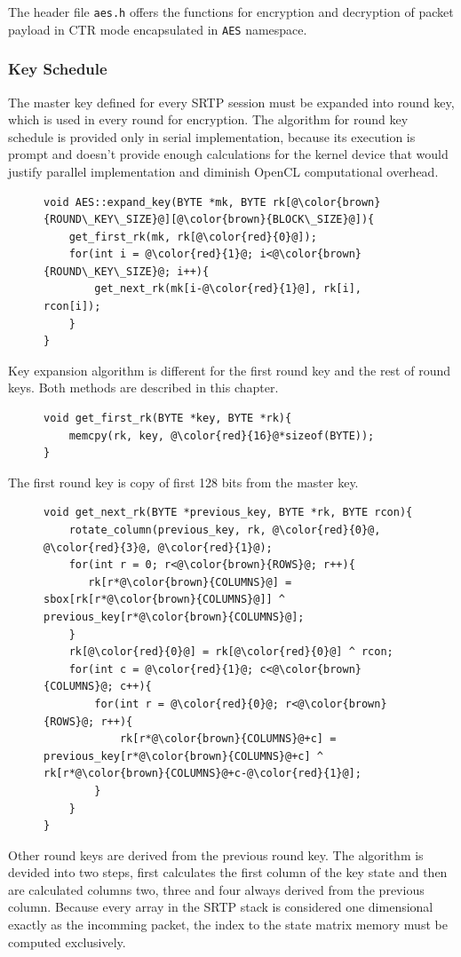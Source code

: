 The header file \texttt{aes.h} offers the functions for encryption and 
decryption of packet payload in CTR mode encapsulated in \texttt{AES} namespace.

\subsubsection*{Key Schedule}
The master key defined for every SRTP session must be expanded into round key,
which is used in every round for encryption. The algorithm for round key schedule
is provided only in serial implementation, because its execution is prompt and
doesn't provide enough calculations for the kernel device that would justify
parallel implementation and diminish OpenCL computational overhead.

\begin{figure}[H]
\begin{lstlisting}
void AES::expand_key(BYTE *mk, BYTE rk[@\color{brown}{ROUND\_KEY\_SIZE}@][@\color{brown}{BLOCK\_SIZE}@]){
    get_first_rk(mk, rk[@\color{red}{0}@]);
    for(int i = @\color{red}{1}@; i<@\color{brown}{ROUND\_KEY\_SIZE}@; i++){
        get_next_rk(mk[i-@\color{red}{1}@], rk[i], rcon[i]);
    }
}
\end{lstlisting}
\end{figure}

Key expansion algorithm is different for the first round key and the rest of
round keys. Both methods are described in this chapter.
 
\begin{figure}[H]
\begin{lstlisting}
void get_first_rk(BYTE *key, BYTE *rk){
    memcpy(rk, key, @\color{red}{16}@*sizeof(BYTE));
}
\end{lstlisting}
\end{figure}

The first round key is copy of first 128 bits from the master key. 

\begin{figure}[H]
\begin{lstlisting}
void get_next_rk(BYTE *previous_key, BYTE *rk, BYTE rcon){
    rotate_column(previous_key, rk, @\color{red}{0}@, @\color{red}{3}@, @\color{red}{1}@);
    for(int r = 0; r<@\color{brown}{ROWS}@; r++){
       rk[r*@\color{brown}{COLUMNS}@] = sbox[rk[r*@\color{brown}{COLUMNS}@]] ^ previous_key[r*@\color{brown}{COLUMNS}@]; 
    }
    rk[@\color{red}{0}@] = rk[@\color{red}{0}@] ^ rcon;
    for(int c = @\color{red}{1}@; c<@\color{brown}{COLUMNS}@; c++){
        for(int r = @\color{red}{0}@; r<@\color{brown}{ROWS}@; r++){
            rk[r*@\color{brown}{COLUMNS}@+c] = previous_key[r*@\color{brown}{COLUMNS}@+c] ^ rk[r*@\color{brown}{COLUMNS}@+c-@\color{red}{1}@];
        }
    }
}
\end{lstlisting}
\end{figure}
Other round keys are derived from the previous round key. The algorithm is 
devided into two steps, first calculates the first column of the key state
and then are calculated columns two, three and four always derived from
the previous column. Because every array in the SRTP stack is considered
one dimensional exactly as the incomming packet, the index to the state matrix
memory must be computed exclusively.

